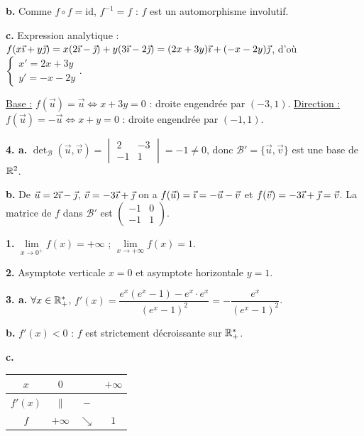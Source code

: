 \documentclass[11pt]{article}
\begin{document}
\textbf{b.} Comme $f\circ f = \mathrm{id}$, $f^{-1} = f$ : $f$ est un automorphisme involutif.

\textbf{c.} Expression analytique : $f(x\vec{\imath} + y\vec{\jmath}) = x(2\vec{\imath} - \vec{\jmath}) + y(3\vec{\imath} - 2\vec{\jmath}) = (2x + 3y)\vec{\imath} + (-x - 2y)\vec{\jmath}$, d'où $\begin{cases} x' = 2x + 3y \\ y' = -x - 2y \end{cases}$.

\underline{Base :} $f(\vec{u}) = \vec{u} \Leftrightarrow x + 3y = 0$ : droite engendrée par $(-3, 1)$. \underline{Direction :} $f(\vec{u}) = -\vec{u} \Leftrightarrow x + y = 0$ : droite engendrée par $(-1, 1)$.

\textbf{4. a.} $\det_{\mathscr{B}}(\vec{u}, \vec{v}) = \begin{vmatrix} 2 & -3 \\ -1 & 1 \end{vmatrix} = -1 \ne 0$, donc $\mathscr{B}' = \{\vec{u}, \vec{v}\}$ est une base de $\mathbb{R}^2$.

\textbf{b.} De $\vec{u} = 2\vec{\imath} - \vec{\jmath}$, $\vec{v} = -3\vec{\imath} + \vec{\jmath}$ on a $f(\vec{u}) = \vec{\imath} = -\vec{u} - \vec{v}$ et $f(\vec{v}) = -3\vec{\imath} + \vec{\jmath} = \vec{v}$. La matrice de $f$ dans $\mathscr{B}'$ est $\begin{pmatrix} -1 & 0 \\ -1 & 1 \end{pmatrix}$.

\textbf{1.} $\lim\limits_{x\to 0^+} f(x) = +\infty$ ; $\lim\limits_{x\to+\infty} f(x) = 1$.

\textbf{2.} Asymptote verticale $x = 0$ et asymptote horizontale $y = 1$.

\textbf{3. a.} $\forall x \in \mathbb{R}_+^*$, $f'(x) = \dfrac{e^x(e^x - 1) - e^x\cdot e^x}{(e^x - 1)^2} = -\dfrac{e^x}{(e^x - 1)^2}$.

\textbf{b.} $f'(x) < 0$ : $f$ est strictement décroissante sur $\mathbb{R}_+^*$.

\textbf{c.}
\begin{center}\renewcommand{\arraystretch}{1.4}
\begin{tabular}{|c|ccc|}
\hline $x$ & $0$ & & $+\infty$ \\\hline $f'(x)$ & $\|$ & $-$ & \\\hline $f$ & $+\infty$ & $\searrow$ & $1$ \\\hline
\end{tabular}
\end{center}
\end{document}
